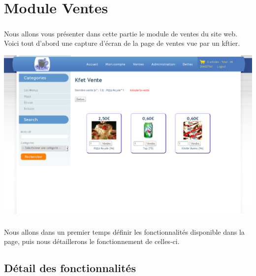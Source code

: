 \documentclass[twoside,UTF8]{EPURapport}
\begin{document}
\chapter{Module Ventes}%

    \paragraph{}Nous allons vous présenter dans cette partie le module de ventes du site web. Voici tout d'abord une capture d'écran de la page de ventes vue par un kftier.
    \begin{center}
        \includegraphics[width=1\linewidth]{logos/ventes.png}
    \end{center}
    \paragraph{}Nous allons dans un premier temps définir les fonctionnalités disponible dans la page, puis nous détaillerons le fonctionnement de celles-ci.

    \section{Détail des fonctionnalités}
\end{document}
